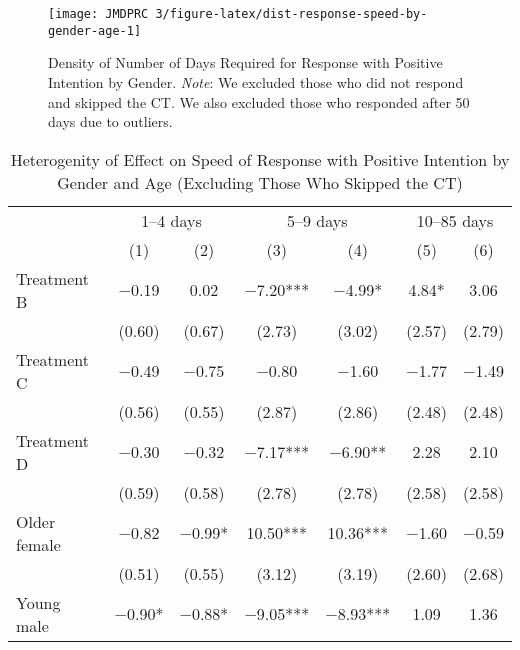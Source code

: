 \documentclass[12pt, a4paper]{article}
\begin{document}
\begin{figure}[t]
\texttt{[image: JMDPRC~3/figure-latex/dist-response-speed-by-gender-age-1]} \caption{Density of Number of Days Required for Response with Positive Intention by Gender. \newline \emph{Note}: We excluded those who did not respond and skipped the CT. We also excluded those who responded after 50 days due to outliers.}\label{fig:dist-response-speed-by-gender-age}
\end{figure}

\begin{table}[H]

\caption{\label{tab:lm-interaction-gender-age-int-time-decompose-noskip}Heterogenity of Effect on Speed of Response with Positive Intention by Gender and Age (Excluding Those Who Skipped the CT)}
\centering
\fontsize{8}{10}\selectfont
\begin{threeparttable}
\begin{tabular}[t]{lcccccc}
\toprule
\multicolumn{1}{c}{ } & \multicolumn{2}{c}{1--4 days} & \multicolumn{2}{c}{5--9 days} & \multicolumn{2}{c}{10--85 days} \\
\cmidrule(l{3pt}r{3pt}){2-3} \cmidrule(l{3pt}r{3pt}){4-5} \cmidrule(l{3pt}r{3pt}){6-7}
  & (1) & (2) & (3) & (4) & (5) & (6)\\
\midrule
Treatment B & \num{-0.19} & \num{0.02} & \num{-7.20}*** & \num{-4.99}* & \num{4.84}* & \num{3.06}\\
 & (\num{0.60}) & (\num{0.67}) & (\num{2.73}) & (\num{3.02}) & (\num{2.57}) & (\num{2.79})\\
Treatment C & \num{-0.49} & \num{-0.75} & \num{-0.80} & \num{-1.60} & \num{-1.77} & \num{-1.49}\\
 & (\num{0.56}) & (\num{0.55}) & (\num{2.87}) & (\num{2.86}) & (\num{2.48}) & (\num{2.48})\\
Treatment D & \num{-0.30} & \num{-0.32} & \num{-7.17}*** & \num{-6.90}** & \num{2.28} & \num{2.10}\\
 & (\num{0.59}) & (\num{0.58}) & (\num{2.78}) & (\num{2.78}) & (\num{2.58}) & (\num{2.58})\\
Older female & \num{-0.82} & \num{-0.99}* & \num{10.50}*** & \num{10.36}*** & \num{-1.60} & \num{-0.59}\\
 & (\num{0.51}) & (\num{0.55}) & (\num{3.12}) & (\num{3.19}) & (\num{2.60}) & (\num{2.68})\\
Young male & \num{-0.90}* & \num{-0.88}* & \num{-9.05}*** & \num{-8.93}*** & \num{1.09} & \num{1.36}\\

\end{tabular}
\end{threeparttable}
\end{table}
\end{document}
